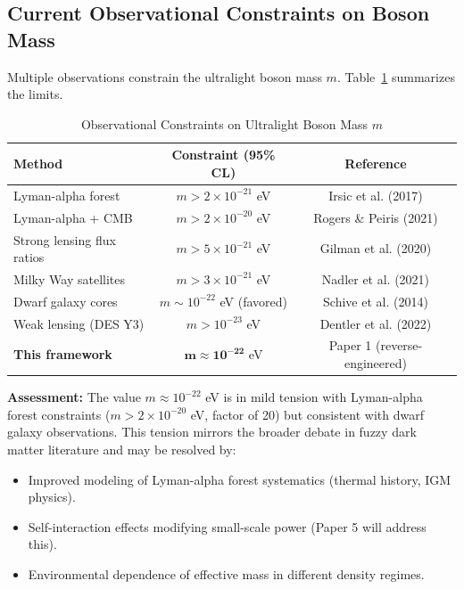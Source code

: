 \documentclass[11pt,a4paper]{article}
\theoremstyle{definition}
\theoremstyle{remark}
\begin{document}
\subsection{Current Observational Constraints on Boson Mass}
\label{sec:mass_constraints}

Multiple observations constrain the ultralight boson mass $m$. Table~\ref{tab:mass_constraints} summarizes the limits.

\begin{table}[H]
\centering
\caption{Observational Constraints on Ultralight Boson Mass $m$}
\label{tab:mass_constraints}
\begin{tabular}{@{}lcc@{}}
\toprule
\textbf{Method} & \textbf{Constraint (95\% CL)} & \textbf{Reference} \\
\midrule
Lyman-alpha forest & $m > 2 \times 10^{-21}$ eV & Irsic et al. (2017) \\
Lyman-alpha + CMB & $m > 2 \times 10^{-20}$ eV & Rogers \& Peiris (2021) \\
Strong lensing flux ratios & $m > 5 \times 10^{-21}$ eV & Gilman et al. (2020) \\
Milky Way satellites & $m > 3 \times 10^{-21}$ eV & Nadler et al. (2021) \\
Dwarf galaxy cores & $m \sim 10^{-22}$ eV (favored) & Schive et al. (2014) \\
Weak lensing (DES Y3) & $m > 10^{-23}$ eV & Dentler et al. (2022) \\
\midrule
\textbf{This framework} & $\mathbf{m \approx 10^{-22}}$ eV & Paper 1 (reverse-engineered) \\
\bottomrule
\end{tabular}
\end{table}

\textbf{Assessment:} The value $m \approx 10^{-22}$ eV is in mild tension with Lyman-alpha forest constraints ($m > 2 \times 10^{-20}$ eV, factor of 20) but consistent with dwarf galaxy observations. This tension mirrors the broader debate in fuzzy dark matter literature and may be resolved by:
\begin{itemize}[leftmargin=*, itemsep=0.2em]
\item Improved modeling of Lyman-alpha forest systematics (thermal history, IGM physics).
\item Self-interaction effects modifying small-scale power (Paper 5 will address this).
\item Environmental dependence of effective mass in different density regimes.
\end{itemize}
\end{document}
